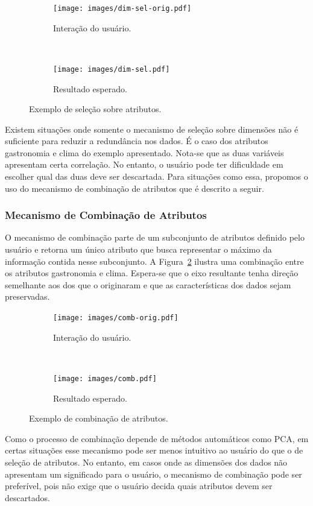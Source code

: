 \begin{figure}[h!]
  \centering
  \begin{subfigure}[b]{0.45\textwidth}
    \centering
    \texttt{[image: images/dim-sel-orig.pdf]}
    \caption{Interação do usuário.}
  \end{subfigure}%
  ~
  \begin{subfigure}[b]{0.45\textwidth}
    \centering
    \texttt{[image: images/dim-sel.pdf]}
    \caption{Resultado esperado.}
  \end{subfigure} 
  \caption{Exemplo de seleção sobre atributos.}
  \label{fig:item-sel}
\end{figure}

Existem situações onde somente o mecanismo de seleção sobre
dimensões não é suficiente para reduzir a redundância nos
dados. É o caso dos atributos gastronomia e clima do exemplo
apresentado. Nota-se que as duas variáveis apresentam certa
correlação. No entanto, o usuário pode ter dificuldade em
escolher qual das duas deve ser descartada. Para situações
como essa, propomos o uso do mecanismo de combinação de
atributos que é descrito a seguir.

\subsubsection{Mecanismo de Combinação de Atributos}

O mecanismo de combinação parte de um subconjunto de atributos
definido pelo usuário e retorna um único atributo que busca
representar o máximo da informação contida nesse subconjunto. A
Figura~\ref{fig:comb} ilustra uma combinação entre os atributos
gastronomia e clima. Espera-se que o eixo resultante tenha
direção semelhante aos dos que o originaram e que as
características dos dados sejam preservadas.

\begin{figure}[h!]
  \centering
  \begin{subfigure}[b]{0.45\textwidth}
    \centering
    \texttt{[image: images/comb-orig.pdf]}
    \caption{Interação do usuário.}
  \end{subfigure}%
  ~
  \begin{subfigure}[b]{0.45\textwidth}
    \centering
    \texttt{[image: images/comb.pdf]}
    \caption{Resultado esperado.}
  \end{subfigure} 
  \caption{Exemplo de combinação de atributos.}
  \label{fig:comb}
\end{figure}

Como o processo de combinação depende de métodos automáticos
como PCA, em certas situações esse mecanismo pode ser menos
intuitivo ao usuário do que o de seleção de atributos. No
entanto, em casos onde as dimensões dos dados não apresentam
um significado para o usuário, o mecanismo de
combinação pode ser preferível, pois não exige que o usuário
decida quais atributos devem ser descartados.

